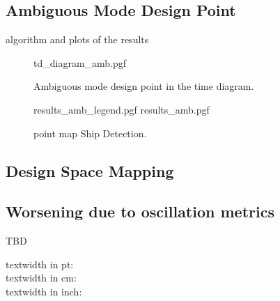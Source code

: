 \documentclass[11pt, a4paper]{scrartcl}
\begin{document}
    \subsection{Ambiguous Mode Design Point}
    \label{subsec:ambiguous_mode_design_point}
    algorithm and plots of the results
    \begin{figure}[!htb]
        \centering
        {td_diagram_amb.pgf}
        \caption{Ambiguous mode design point in the time diagram.
        }
        \label{fig:ambigmode}
    \end{figure}
    \begin{figure}[!htb]
        \centering
        {results_amb_legend.pgf}
        {results_amb.pgf}
        \caption{point map Ship Detection.}
        \label{fig:ambigresult}
    \end{figure}

    \subsection{Design Space Mapping}
    \label{subsec:design_space_mapping}

    \subsection{Worsening due to oscillation metrics}
    \label{subsec:worsening_due_to_oscillation_metrics}
    TBD


    
    

    textwidth in pt: \the\textwidth \\
    textwidth in cm: \prntlen{\textwidth}\\
    textwidth in inch: \prntlen{\textwidth}\\
\end{document}
